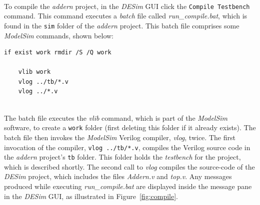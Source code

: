 \documentclass[epsfig,10pt,fullpage]{article} \addtolength{\textwidth}{1.5in}
\begin{document}
~\\
\noindent
To compile the {\it addern} project, in the {\it DESim} GUI click the \texttt{Compile Testbench}
command. This command executes a {\it batch} file called {\it run\_compile.bat}, which is 
found in the \texttt{sim} folder of the {\it addern} project. This batch file comprises
some {\it ModelSim} commands, shown below:

\lstset{language=command.com,numbers=none,escapechar=|}
\begin{lstlisting}[]
    if exist work rmdir /S /Q work

    vlib work
    vlog ../tb/*.v
    vlog ../*.v
\end{lstlisting}

~\\
\noindent
The batch file executes the {\it vlib} command, which is part of the {\it ModelSim} software,
to create a \texttt{work} folder (first deleting this folder if it already exists). The batch file
then invokes the {\it ModelSim} Verilog compiler, {\it vlog}, twice. The first invocation
of the compiler, \texttt{vlog ../tb/*.v}, compiles the Verilog source code in the {\it addern}
project's \texttt{tb} folder. This folder holds the {\it testbench} for the project, which is
described shortly. The second call to {\it vlog} compiles the source-code of the 
{\it DESim} project, which includes the files {\it Addern.v} and {\it top.v}. Any messages
produced while executing {\it run\_compile.bat} are displayed inside the message pane in
the {\it DESim} GUI, as illustrated in Figure~\ref{fig:compile}.
\end{document}
